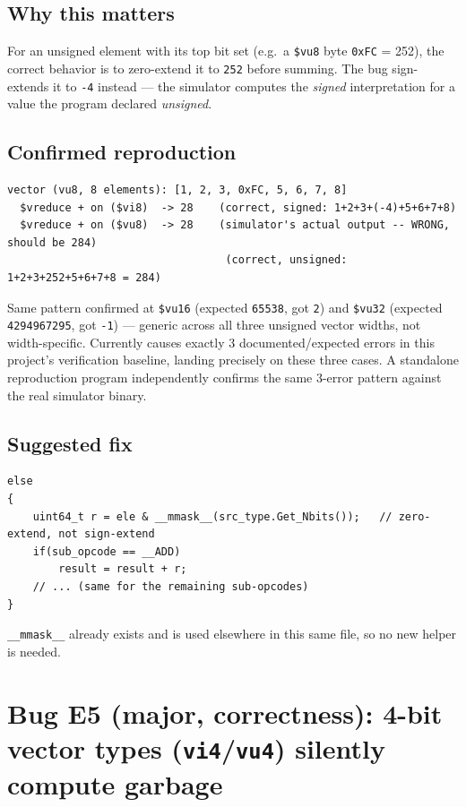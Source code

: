 \documentclass[11pt,a4paper]{report}
\begin{document}
\subsection*{Why this matters}
For an unsigned element with its top bit set (e.g.\ a \texttt{\$vu8} byte \texttt{0xFC} =
252), the correct behavior is to zero-extend it to \texttt{252} before summing. The bug
sign-extends it to \texttt{-4} instead --- the simulator computes the \emph{signed}
interpretation for a value the program declared \emph{unsigned}.

\subsection*{Confirmed reproduction}
\begin{lstlisting}[caption={Reproduction, exact numbers}]
vector (vu8, 8 elements): [1, 2, 3, 0xFC, 5, 6, 7, 8]
  $vreduce + on ($vi8)  -> 28    (correct, signed: 1+2+3+(-4)+5+6+7+8)
  $vreduce + on ($vu8)  -> 28    (simulator's actual output -- WRONG, should be 284)
                                  (correct, unsigned: 1+2+3+252+5+6+7+8 = 284)
\end{lstlisting}
Same pattern confirmed at \texttt{\$vu16} (expected \texttt{65538}, got \texttt{2}) and
\texttt{\$vu32} (expected \texttt{4294967295}, got \texttt{-1}) --- generic across all three
unsigned vector widths, not width-specific. Currently causes exactly 3 documented/expected
errors in this project's verification baseline, landing precisely on these three cases. A
standalone reproduction program independently confirms the same 3-error pattern against the
real simulator binary.

\subsection*{Suggested fix}
\begin{lstlisting}[caption={Minimal fix}]
else
{
    uint64_t r = ele & __mmask__(src_type.Get_Nbits());   // zero-extend, not sign-extend
    if(sub_opcode == __ADD)
        result = result + r;
    // ... (same for the remaining sub-opcodes)
}
\end{lstlisting}
\texttt{\_\_mmask\_\_} already exists and is used elsewhere in this same file, so no new
helper is needed.

\section{Bug E5 (major, correctness): 4-bit vector types (\texttt{vi4}/\texttt{vu4}) silently compute garbage}
\end{document}
